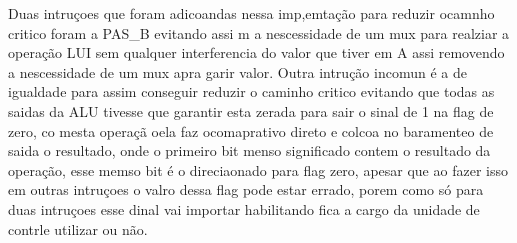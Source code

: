 Duas intruçoes que foram adicoandas nessa imp,emtação para reduzir ocamnho critico foram a PAS\_B evitando assi m a nescessidade de um mux para realziar a operação LUI sem qualquer interferencia do valor que tiver em A assi removendo a nescessidade de um mux apra garir valor. Outra intrução incomun é a de igualdade para assim conseguir reduzir o caminho critico evitando que todas as saidas da ALU tivesse que garantir esta zerada para sair o sinal de 1 na flag de zero, co mesta operaçã oela faz  ocomaprativo direto e colcoa no baramenteo de saida o resultado, onde o primeiro bit menso significado contem o resultado da operação, esse memso bit é o direciaonado para flag zero, apesar que ao fazer isso em outras intruçoes o valro dessa flag pode estar errado, porem como só para duas intruçoes esse dinal vai importar habilitando fica a cargo da unidade de contrle utilizar ou não. 


